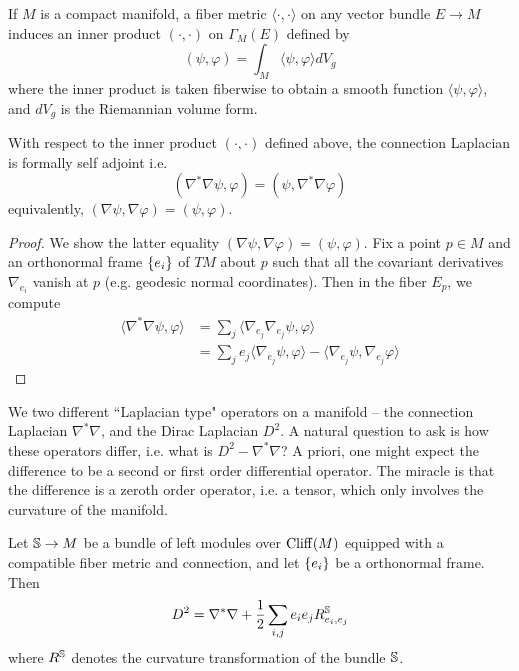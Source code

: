 %
If $M$ is a compact manifold, a fiber metric $\langle\cdot,\cdot\rangle$ on
any vector bundle $E \to M$ induces an inner product $(\cdot,\cdot)$ on
$\Gamma_M(E)$ defined by
\[
(\psi, \varphi) = \int_M \langle \psi, \varphi \rangle dV_g
\]
where the inner product is taken fiberwise to obtain a smooth function
$\langle \psi,\varphi\rangle$, and $dV_g$ is the Riemannian volume form.
%
\begin{prop}
With respect to the inner product $(\cdot,\cdot)$ defined above, the connection
Laplacian is formally self adjoint i.e.
\[
(\nabla^*\nabla \psi, \varphi) = (\psi, \nabla^*\nabla\varphi)
\]
equivalently, $(\nabla\psi, \nabla\varphi) = (\psi, \varphi)$.
\end{prop}
%
\begin{proof} %
We show the latter equality $(\nabla\psi, \nabla\varphi) = (\psi, \varphi)$. Fix
a point $p \in M$ and an orthonormal frame $\set{e_i}$ of $TM$ about $p$ such that all
the covariant derivatives $\nabla_{e_i}$ vanish at $p$ (e.g. geodesic normal
coordinates). Then in the fiber $E_p$, we
compute
\begin{align*}
\langle \nabla^*\nabla\psi, \varphi \rangle
&= \sum_j \langle \nabla_{e_j}\nabla_{e_j}\psi, \varphi \rangle \\
&= \sum_j e_j\langle \nabla_{e_j}\psi,\varphi \rangle
- \langle\nabla_{e_j}\psi,\nabla_{e_j}\varphi \rangle
\end{align*}
\end{proof}
%
We two different ``Laplacian type" operators on a manifold -- the connection
Laplacian $\nabla^*\nabla$, and the Dirac Laplacian $D^2$. A natural question
to ask is how these operators differ, i.e. what is $D^2 - \nabla^*\nabla$? A priori,
one might expect the difference to be a second or first order differential operator.
The miracle is that the difference is a zeroth order operator, i.e. a tensor, which
only involves the curvature of the manifold.
%
\begin{thm}
Let $\S \to M$ be a bundle of left modules over $\Cliff(M)$ equipped with a compatible
fiber metric and connection, and let $\set{e_i}$ be a orthonormal frame. Then
\[
D^2 = \nabla^*\nabla + \frac{1}{2}\sum_{i, j} e_i e_j R^\S_{e_i, e_j}
\]
where $R^\S$ denotes the curvature transformation of the bundle $\S$.
\end{thm}
%
